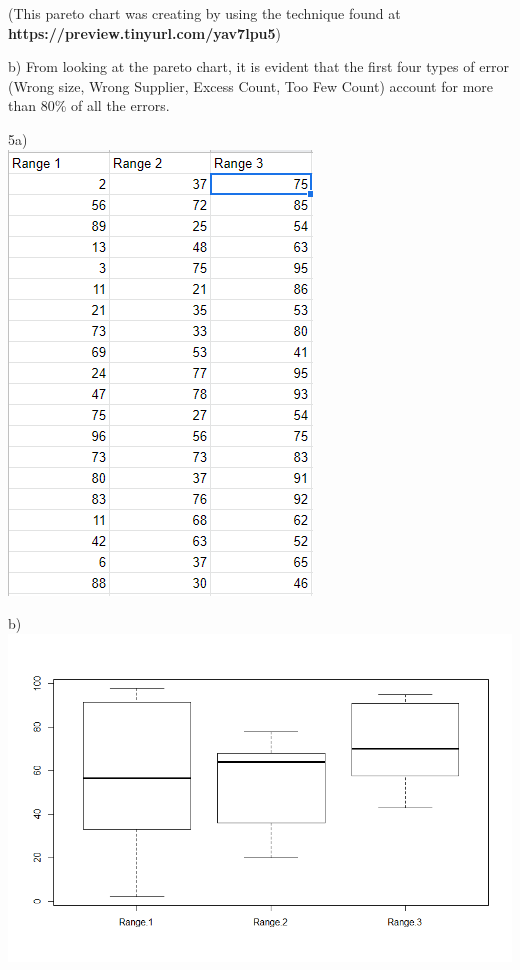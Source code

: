 \documentclass[12pt]{report}
\begin{document}
\scriptsize

(This pareto chart was creating by using the technique found at
 \textbf{https://preview.tinyurl.com/yav7lpu5}) 
\normalsize

\bigskip

\noindent b) From looking at the pareto chart, it is evident that the first four types of error (Wrong size, Wrong Supplier, Excess Count, Too Few Count) account for more than 80\% of all the errors.

\clearpage

\noindent 5a) \\\includegraphics[scale=0.7]{raw_data}

\noindent b) \\\includegraphics[scale=0.6]{box_plot}
\end{document}
